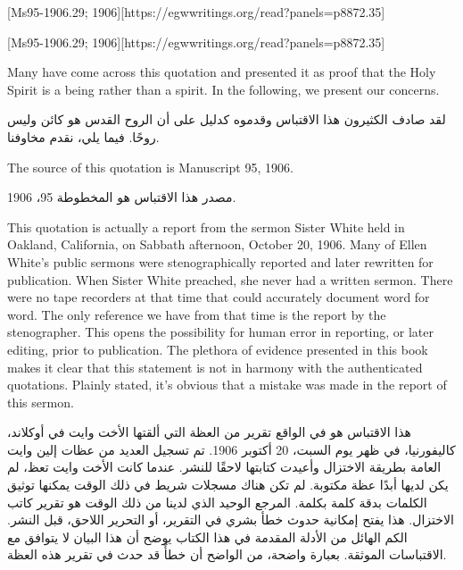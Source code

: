 [Ms95-1906.29; 1906][https://egwwritings.org/read?panels=p8872.35]


[Ms95-1906.29; 1906][https://egwwritings.org/read?panels=p8872.35]


Many have come across this quotation and presented it as proof that the Holy Spirit is a being rather than a spirit. In the following, we present our concerns.


لقد صادف الكثيرون هذا الاقتباس وقدموه كدليل على أن الروح القدس هو كائن وليس روحًا. فيما يلي، نقدم مخاوفنا.


The source of this quotation is Manuscript 95, 1906.


مصدر هذا الاقتباس هو المخطوطة 95، 1906.


This quotation is actually a report from the sermon Sister White held in Oakland, California, on Sabbath afternoon, October 20, 1906. Many of Ellen White’s public sermons were stenographically reported and later rewritten for publication. When Sister White preached, she never had a written sermon. There were no tape recorders at that time that could accurately document word for word. The only reference we have from that time is the report by the stenographer. This opens the possibility for human error in reporting, or later editing, prior to publication. The plethora of evidence presented in this book makes it clear that this statement is not in harmony with the authenticated quotations. Plainly stated, it’s obvious that a mistake was made in the report of this sermon.


هذا الاقتباس هو في الواقع تقرير من العظة التي ألقتها الأخت وايت في أوكلاند، كاليفورنيا، في ظهر يوم السبت، 20 أكتوبر 1906. تم تسجيل العديد من عظات إلين وايت العامة بطريقة الاختزال وأعيدت كتابتها لاحقًا للنشر. عندما كانت الأخت وايت تعظ، لم يكن لديها أبدًا عظة مكتوبة. لم تكن هناك مسجلات شريط في ذلك الوقت يمكنها توثيق الكلمات بدقة كلمة بكلمة. المرجع الوحيد الذي لدينا من ذلك الوقت هو تقرير كاتب الاختزال. هذا يفتح إمكانية حدوث خطأ بشري في التقرير، أو التحرير اللاحق، قبل النشر. الكم الهائل من الأدلة المقدمة في هذا الكتاب يوضح أن هذا البيان لا يتوافق مع الاقتباسات الموثقة. بعبارة واضحة، من الواضح أن خطأً قد حدث في تقرير هذه العظة.


